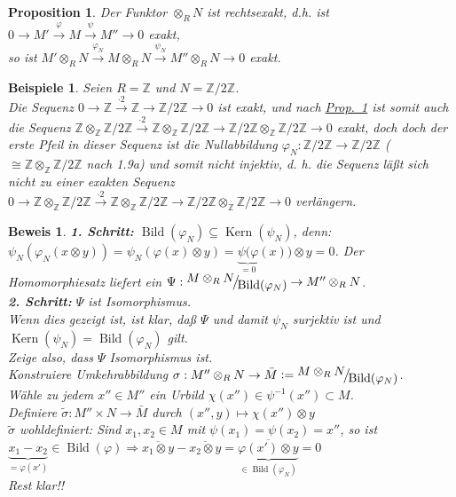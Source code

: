 \documentclass[a4paper,12pt]{scrbook}
\theoremstyle{break}
\newtheorem{Prop}[Def]{Proposition}
\theoremstyle{nonumberbreak}
\newtheorem{Bew}{Beweis}
\newtheorem{nnBsp}{Beispiele}
\theoremstyle{nonumberplain}
\newcommand{\defeqr}[0]{\mathrel{\mathop:}=}
\newcommand{\myref}[2]{%
\hyperref[#2]{#1~\ref*{#2}}%
}
\DeclareMathOperator{\Kern}{Kern}
\DeclareMathOperator{\Bild}{Bild}
\newcommand{\FakRaum}[2]{
  \raisebox{0.7ex}{\ensuremath{#1}}
  \ensuremath{\mkern-3mu}\big/\ensuremath{\mkern-3mu}
  \raisebox{-0.6ex}{\ensuremath{#2}}}
\begin{document}
\begin{Prop}
\label{1.12}
  Der Funktor $\otimes_R N$ ist rechtsexakt, d.h. ist $0 \to M'
  \overset{\varphi}{\to} M \overset{\psi}{\to} M'' \to 0$ exakt,\\
  so ist $ M' \otimes_R N \overset{\varphi_N}{\to} M \otimes_R N \overset{\psi_N}{\to} M'' \otimes_R N \to 0$ exakt.
\end{Prop}

\begin{nnBsp} 
  Seien $R = \mathbb{Z}$ und $N = \mathbb{Z}/2 \mathbb{Z}$.\\
  Die Sequenz $0 \to \mathbb{Z} \overset{ \cdot 2}{\to} \mathbb{Z} \to \mathbb{Z}/2
  \mathbb{Z} \to 0$ ist exakt, und nach \myref{Prop.}{1.12} ist somit auch die
  Sequenz
  $\mathbb{Z} \otimes_{\mathbb{Z}} \mathbb{Z} / 2 \mathbb{Z}  \overset{ \cdot 2}{\to} \mathbb{Z} \otimes_{\mathbb{Z}} \mathbb{Z} / 2  \mathbb{Z} \to \mathbb{Z}/2
  \mathbb{Z} \otimes_{\mathbb{Z}} \mathbb{Z} / 2 \mathbb{Z} \to 0$ exakt,
  doch doch der erste Pfeil in dieser Sequenz ist die Nullabbildung
   $\varphi_N: \mathbb{Z}/2 \mathbb{Z} \to \mathbb{Z} / 2 \mathbb{Z}$ ($\cong
  \mathbb{Z} \otimes_{\mathbb{Z}} \mathbb{Z} / 2 \mathbb{Z}$ nach 1.9a) und
   somit nicht injektiv, d. h. die Sequenz läßt sich nicht zu einer exakten Sequenz
   $0 \to \mathbb{Z} \otimes_{\mathbb{Z}} \mathbb{Z} / 2 \mathbb{Z}  \overset{ \cdot 2}{\to} \mathbb{Z} \otimes_{\mathbb{Z}} \mathbb{Z} / 2  \mathbb{Z} \to \mathbb{Z}/2
  \mathbb{Z} \otimes_{\mathbb{Z}} \mathbb{Z} / 2 \mathbb{Z} \to 0$ verlängern.
\end{nnBsp}

\begin{Bew} 
  \textbf{1. Schritt:} $\Bild(\varphi_N) \subseteq \Kern(\psi_N)$,
  denn: $\psi_N(\varphi_N(x \otimes y)) = \psi_N(\varphi(x) \otimes y) =
  \underset{=0}{\underbrace{\psi(\varphi}}(x)) \otimes y = 0$. Der Homomorphiesatz
  liefert ein $\Psi: \FakRaum{M \otimes_R N}{\Bild(\varphi_N)} \to M'' \otimes_R N$.\\
  \textbf{2. Schritt:} $\Psi$ ist Isomorphismus.\\
  Wenn dies gezeigt ist, ist klar, daß $\Psi$ und damit $\psi_N$ surjektiv ist und $\Kern(\psi_N) =
  \Bild(\varphi_N)$ gilt.\\
  Zeige also, dass $\Psi$ Isomorphismus ist.\\
  Konstruiere Umkehrabbildung $\sigma: M'' \otimes_R N \to \bar{M} \defeqr \FakRaum{M
  \otimes_R N}{\Bild(\varphi_N)}$.\\
  Wähle zu jedem $x'' \in M''$ ein Urbild $\chi(x'') \in \psi^{-1}(x'') \subset M$.\\
  Definiere $\tilde{\sigma}: M'' \times N \to \bar{M}$ durch $(x'', y) \mapsto
  \chi(x'') \otimes y$\\
  $\tilde{\sigma}$ wohldefiniert:
  Sind $x_1,x_2 \in M$ mit $\psi(x_1) = \psi(x_2) = x''$, so ist $\underset{= \varphi(x')
  }{\underbrace{x_1 - x_2}} \in \Bild(\varphi) \Rightarrow \overline{x_1
  \otimes y} - \overline{x_2 \otimes y} = \underbrace{\overline{\varphi(x') \otimes y}}_{\in \Bild(\varphi_N)} = 0$\\
  Rest klar!!
\end{Bew}
\end{document}
